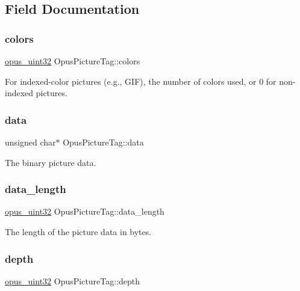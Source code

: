 \subsection{Field Documentation}
\mbox{\label{struct_opus_picture_tag_a6fe2f98151fa32a8e2fd13f9309bd1a2}} 
\subsubsection{\texorpdfstring{colors}{colors}}
{\footnotesize\ttfamily \hyperlink{opus__types_8h_a643eaaadb9ef6cd44308e0299d8cd8ce}{opus\+\_\+uint32} Opus\+Picture\+Tag\+::colors}

For indexed-\/color pictures (e.\+g., G\+IF), the number of colors used, or 0 for non-\/indexed pictures. \mbox{\label{struct_opus_picture_tag_a0514cb1431547c8b3042b9f3bc9b694f}} 
\subsubsection{\texorpdfstring{data}{data}}
{\footnotesize\ttfamily unsigned char$\ast$ Opus\+Picture\+Tag\+::data}

The binary picture data. \mbox{\label{struct_opus_picture_tag_aaa458d48cd3c9c86b54614389f5b726d}} 
\subsubsection{\texorpdfstring{data\+\_\+length}{data\_length}}
{\footnotesize\ttfamily \hyperlink{opus__types_8h_a643eaaadb9ef6cd44308e0299d8cd8ce}{opus\+\_\+uint32} Opus\+Picture\+Tag\+::data\+\_\+length}

The length of the picture data in bytes. \mbox{\label{struct_opus_picture_tag_a9af23c314edf9a995c95a4d28f49eac0}} 
\subsubsection{\texorpdfstring{depth}{depth}}
{\footnotesize\ttfamily \hyperlink{opus__types_8h_a643eaaadb9ef6cd44308e0299d8cd8ce}{opus\+\_\+uint32} Opus\+Picture\+Tag\+::depth}

